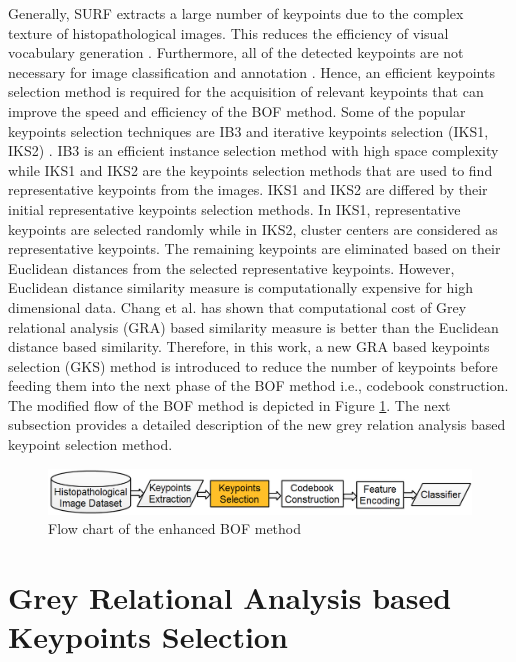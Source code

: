 Generally, SURF extracts a large number of keypoints due to the complex texture of histopathological images. This reduces the efficiency of visual vocabulary generation \cite{lin2016}. Furthermore, all of the detected keypoints are not necessary for image classification and annotation \cite{lin2016}. Hence, an efficient keypoints selection method is required for the acquisition of relevant keypoints that can improve the speed and efficiency of the BOF method.  Some of the popular keypoints selection techniques are IB3 \cite{aha1991} and iterative keypoints selection (IKS1, IKS2) \cite{lin2016}. IB3 is an efficient instance selection method with high space complexity while IKS1 and IKS2 are the keypoints selection methods that are used to find representative keypoints from the images. IKS1 and IKS2 are differed by their initial representative keypoints selection methods. In IKS1, representative keypoints are selected randomly while in IKS2, cluster centers are considered as representative keypoints. The remaining keypoints are eliminated based on their Euclidean distances from the selected representative keypoints. However, Euclidean distance similarity measure is computationally expensive for high dimensional data. Chang et al. \cite{chang2005} has shown that computational cost of Grey relational analysis (GRA) \cite{julong1989} based similarity measure is better than the Euclidean distance based similarity.  Therefore, in this work, a new GRA based keypoints selection (GKS) method is introduced to reduce the number of keypoints before feeding them into the next phase of the BOF method i.e., codebook construction. The modified flow of the BOF method is depicted in Figure \ref{ch3:fig:mbof}. The next subsection provides a detailed description of the new grey relation analysis based keypoint selection method. 

\begin{figure}[t]
            \centering
            \includegraphics[width=1.0\textwidth]{BOF}
            \caption[Flow chart of the enhanced BOF method]{\fontsize{10}{12}\selectfont Flow chart of the enhanced BOF method}\label{ch3:fig:mbof}
\end{figure}



\section{Grey Relational Analysis based Keypoints Selection} \label{ch3:sec:Grey Relational Analysis based Keypoints Selection}


